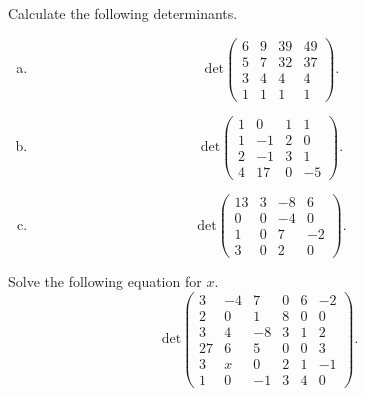 \documentclass[a4paper,11pt]{article}
\begin{document}
 Calculate the following determinants.
\begin{enumerate}[(a)]
\item
  \[
    \text{det}
    \left(
      \begin{array}{rrrr}
        6 & 9 & 39 & 49 \\
        5 & 7 & 32 & 37 \\
        3 & 4 & 4 & 4 \\
        1 & 1 & 1 & 1
      \end{array}
    \right).
  \]
\item
  \[
    \text{det}
    \left(
      \begin{array}{rrrr}
        1 & 0 & 1 & 1 \\
        1 & -1 & 2 & 0 \\
        2 & -1 & 3 & 1 \\
        4 & 17 & 0 & -5
      \end{array}
    \right).
  \]
\item
  \[
    \text{det}
    \left(
      \begin{array}{rrrr}
        13 & 3 & -8 & 6 \\
        0 & 0 & -4 & 0 \\
        1 & 0 & 7 & -2 \\
        3 & 0 & 2 & 0
      \end{array}
    \right).
  \]
\end{enumerate}

 Solve the following equation for $x$.
\[
  \text{det}
  \left(
    \begin{array}{rrrrrr}
      3 & -4 & 7 & 0 & 6 & -2 \\
      2 & 0 & 1 & 8 & 0 & 0 \\
      3 & 4 & -8 & 3 & 1 & 2 \\
      27 & 6 & 5 & 0 & 0 & 3 \\
      3 & x & 0 & 2 & 1 & -1 \\
      1 & 0 & -1 & 3 & 4 & 0
    \end{array}
  \right).
\] \\
\end{document}
